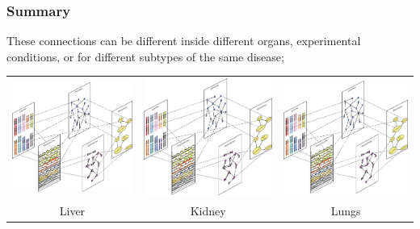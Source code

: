 \documentclass[10pt]{beamer}
\theoremstyle{definition}
\begin{document}
\begin{frame}
\frametitle{Summary}

These connections can be different inside different organs, experimental conditions, or for different subtypes of the same disease;

\begin{center}
\begin{scriptsize}
\begin{tabular}{ccc}
\includegraphics[width=.3\textwidth,angle=-90]{data_integration_schematic}\vspace{.5em}
& \includegraphics[width=.3\textwidth,angle=-90]{data_integration_schematic}\vspace{.5em}
& \includegraphics[width=.3\textwidth,angle=-90]{data_integration_schematic}\vspace{.5em}\\
Liver & Kidney & Lungs\\
\end{tabular}
\end{scriptsize}
\end{center}
\end{frame}
\end{document}
